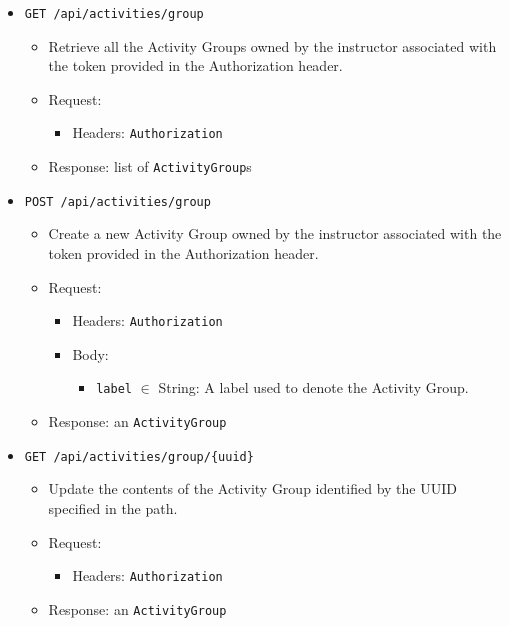 \begin{chapterBody}
\begin{itemize}
    \item \texttt{GET /api/activities/group}
    \begin{itemize}
        \item Retrieve all the Activity Groups owned by the instructor 
associated  with the token provided in the Authorization header.
        \item Request:
        \begin{itemize}
            \item Headers: \texttt{Authorization}
        \end{itemize}
        \item Response: list of \texttt{ActivityGroup}s
    \end{itemize}
    \item \texttt{POST /api/activities/group}
    \begin{itemize}
        \item Create a new Activity Group owned by the instructor associated 
with the token provided in the Authorization header.
        \item Request:
        \begin{itemize}
            \item Headers: \texttt{Authorization}
            \item Body:
            \begin{itemize}
                \item \texttt{label} $ \in $ String: A label used to denote 
the Activity Group.
            \end{itemize}
        \end{itemize}
        \item Response: an \texttt{ActivityGroup}
    \end{itemize}
    \item \texttt{GET /api/activities/group/\{uuid\}}
    \begin{itemize}
        \item Update the contents of the Activity Group identified by the
UUID specified in the path.
        \item Request:
        \begin{itemize}
            \item Headers: \texttt{Authorization}
        \end{itemize}
        \item Response: an \texttt{ActivityGroup}
    \end{itemize}

\end{itemize}
\end{chapterBody}
